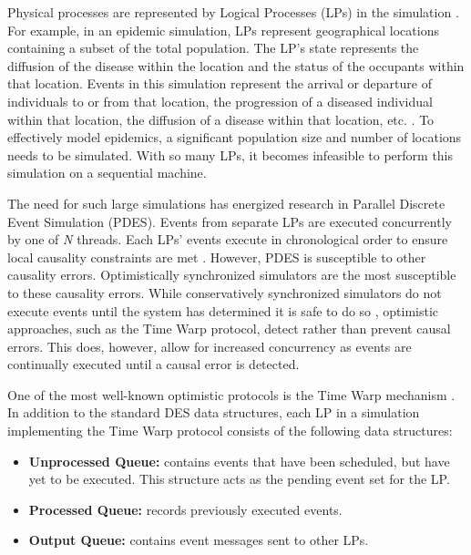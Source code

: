 \documentclass[11pt]{book}
\begin{document}
Physical processes are represented by Logical Processes (LPs) in the simulation
\cite{des_misra}.  For example, in an epidemic simulation, LPs represent
geographical locations containing a subset of the total population.  The LP's
state represents the diffusion of the disease within the location and the status
of the occupants within that location.  Events in this simulation represent the
arrival or departure of individuals to or from that location, the progression of
a diseased individual within that location, the diffusion of a disease within
that location, etc. \cite{epidemic}. To effectively model epidemics, a
significant population size and number of locations needs to be simulated.  With
so many LPs, it becomes infeasible to perform this simulation on a sequential
machine.  

The need for such large simulations has energized research in Parallel Discrete
Event Simulation (PDES).  Events from separate LPs are executed concurrently by
one of \emph{N} threads.  Each LPs' events execute in chronological order to
ensure local causality constraints are met \cite{fujimoto}.  However, PDES is
susceptible to other causality errors.  Optimistically synchronized simulators
are the most susceptible to these causality errors.  While conservatively synchronized
simulators do not execute events until the system has determined it is safe to
do so \cite{fujimoto}, optimistic approaches, such as the Time Warp protocol,
detect rather than prevent causal errors.  This does, however, allow for
increased concurrency as events are continually executed until a causal error is
detected. 

One of the most well-known optimistic protocols is the Time Warp mechanism
\cite{fujimoto}.  In addition to the standard DES data structures, each LP in a simulation
implementing the Time Warp protocol consists of the following data structures:

\begin{itemize}
  \item \textbf{Unprocessed Queue:} contains events that have been scheduled, but have yet
    to be executed.  This structure acts as the pending event set for the LP.
  \item\textbf{Processed Queue:} records previously executed events.
  \item\textbf{Output Queue:} contains event messages sent to other LPs.
\end{itemize}
\end{document}
